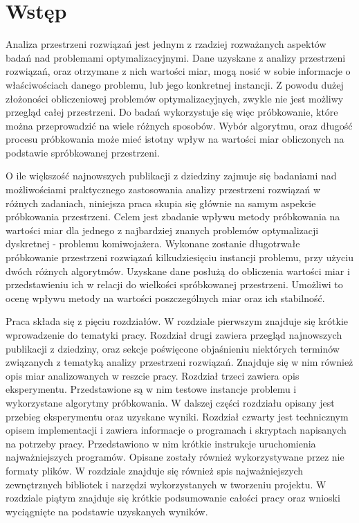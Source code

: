 \chapter{Wstęp}

Analiza przestrzeni rozwiązań jest jednym z rzadziej rozważanych aspektów badań nad problemami optymalizacyjnymi.
Dane uzyskane z analizy przestrzeni rozwiązań, oraz otrzymane z nich wartości miar, mogą nosić w sobie
informacje o właściwościach danego problemu, lub jego konkretnej instancji.
Z powodu dużej złożoności obliczeniowej problemów optymalizacyjnych, zwykle nie jest możliwy przegląd całej przestrzeni.
Do badań wykorzystuje się więc próbkowanie, które można przeprowadzić na wiele różnych sposobów.
Wybór algorytmu, oraz długość procesu próbkowania może mieć istotny wpływ na wartości miar obliczonych na podstawie spróbkowanej przestrzeni.

O ile większość najnowszych publikacji z dziedziny zajmuje się badaniami nad możliwościami praktycznego zastosowania analizy przestrzeni rozwiązań w różnych zadaniach,
niniejsza praca skupia się głównie na samym aspekcie próbkowania przestrzeni.
Celem jest zbadanie wpływu metody próbkowania na wartości miar dla jednego z najbardziej znanych 
problemów optymalizacji dyskretnej - problemu komiwojażera.
Wykonane zostanie długotrwałe próbkowanie przestrzeni rozwiązań kilkudziesięciu instancji problemu, przy użyciu dwóch różnych algorytmów.
Uzyskane dane posłużą do obliczenia wartości miar i przedstawieniu ich w relacji do wielkości spróbkowanej przestrzeni.
Umożliwi to ocenę wpływu metody na wartości poszczególnych miar oraz ich stabilność.

Praca składa się z pięciu rozdziałów.
W rozdziale pierwszym znajduje się krótkie wprowadzenie do tematyki pracy.
Rozdział drugi zawiera przegląd najnowszych publikacji z dziedziny, oraz sekcje poświęcone objaśnieniu niektórych terminów związanych z tematyką
analizy przestrzeni rozwiązań. Znajduje się w nim również opis miar analizowanych w reszcie pracy.
Rozdział trzeci zawiera opis eksperymentu. Przedstawione są w nim testowe instancje problemu i wykorzystane algorytmy próbkowania.
W dalszej części rozdziału opisany jest przebieg eksperymentu oraz uzyskane wyniki.
Rozdział czwarty jest technicznym opisem implementacji i zawiera informacje o programach i skryptach napisanych na potrzeby pracy.
Przedstawiono w nim krótkie instrukcje uruchomienia najważniejszych programów. Opisane zostały również wykorzystywane przez nie formaty plików.
W rozdziale znajduje się również spis najważniejszych zewnętrznych bibliotek i narzędzi wykorzystanych w tworzeniu projektu.
W rozdziale piątym znajduje się krótkie podsumowanie całości pracy oraz wnioski wyciągnięte na podstawie uzyskanych wyników.
